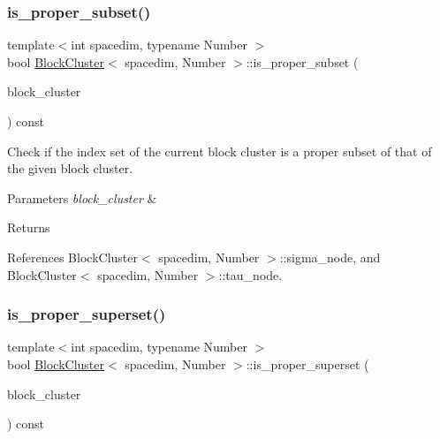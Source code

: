 \subsubsection{\texorpdfstring{is\+\_\+proper\+\_\+subset()}{is\_proper\_subset()}}
{\footnotesize\ttfamily template$<$int spacedim, typename Number $>$ \\
bool \hyperlink{classBlockCluster}{Block\+Cluster}$<$ spacedim, Number $>$\+::is\+\_\+proper\+\_\+subset (\begin{DoxyParamCaption}\item[{const \hyperlink{classBlockCluster}{Block\+Cluster}$<$ spacedim, Number $>$ \&}]{block\+\_\+cluster }\end{DoxyParamCaption}) const}

Check if the index set of the current block cluster is a proper subset of that of the given block cluster. 
\begin{DoxyParams}{Parameters}
{\em block\+\_\+cluster} & \\
\hline
\end{DoxyParams}
\begin{DoxyReturn}{Returns}

\end{DoxyReturn}


References Block\+Cluster$<$ spacedim, Number $>$\+::sigma\+\_\+node, and Block\+Cluster$<$ spacedim, Number $>$\+::tau\+\_\+node.

\mbox{\label{classBlockCluster_ad81d5a494f48b16662ef471966899b65}} 
\subsubsection{\texorpdfstring{is\+\_\+proper\+\_\+superset()}{is\_proper\_superset()}}
{\footnotesize\ttfamily template$<$int spacedim, typename Number $>$ \\
bool \hyperlink{classBlockCluster}{Block\+Cluster}$<$ spacedim, Number $>$\+::is\+\_\+proper\+\_\+superset (\begin{DoxyParamCaption}\item[{const \hyperlink{classBlockCluster}{Block\+Cluster}$<$ spacedim, Number $>$ \&}]{block\+\_\+cluster }\end{DoxyParamCaption}) const}

